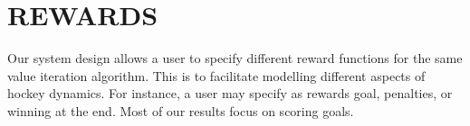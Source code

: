 \documentclass[]{article}
\begin{document}










\section{REWARDS}

Our system design allows a user to specify different reward functions for the same value iteration algorithm. This is to facilitate modelling different aspects of hockey dynamics. For instance, a user may specify as rewards goal, penalties, or winning at the end. Most of our results focus on scoring goals.
\end{document}

